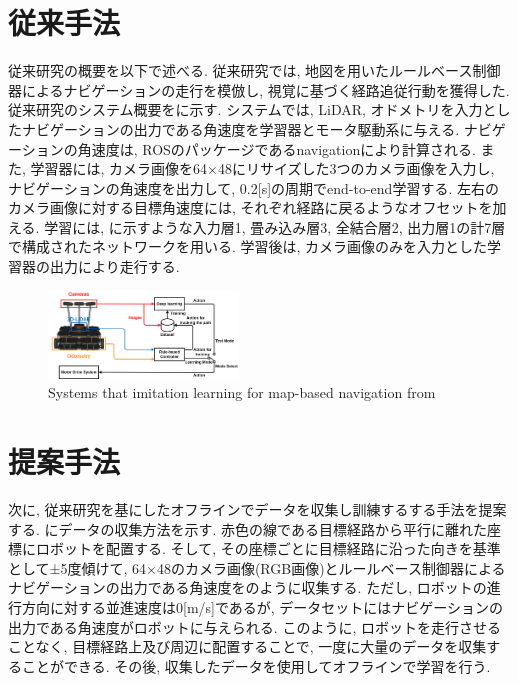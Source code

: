 \documentclass[10pt]{ujarticle}
\begin{document}
    \section{従来手法}%
    従来研究の概要を以下で述べる. 従来研究では, 地図を用いたルールベース制御器によるナビゲーションの走行を模倣し, 視覚に基づく経路追従行動を獲得した. 従来研究のシステム概要をに示す. システムでは, LiDAR, オドメトリを入力としたナビゲーションの出力である角速度を学習器とモータ駆動系に与える. ナビゲーションの角速度は, ROSのパッケージであるnavigation\cite{navigation}により計算される. また, 学習器には, カメラ画像を64×48にリサイズした3つのカメラ画像を入力し, ナビゲーションの角速度を出力して, 0.2[s]の周期でend-to-end学習する. 左右のカメラ画像に対する目標角速度には, それぞれ経路に戻るようなオフセットを加える. 学習には, に示すような入力層1, 畳み込み層3, 全結合層2, 出力層1の計7層で構成されたネットワークを用いる. 学習後は, カメラ画像のみを入力とした学習器の出力により走行する. 

    \begin{center}
        \begin{figure}[h]
            \centering
            \includegraphics[width=0.45\textwidth]{fig/si2020-okada.png}
            \caption{Systems that imitation learning for map-based navigation from }
            \label{Fig:si2020-okada}
        \end{figure}
    \end{center}

    \section{提案手法}%
    次に, 従来研究を基にしたオフラインでデータを収集し訓練するする手法を提案する. にデータの収集方法を示す. 赤色の線である目標経路から平行に離れた座標にロボットを配置する. そして, その座標ごとに目標経路に沿った向きを基準として±5度傾けて, 64×48のカメラ画像(RGB画像)とルールベース制御器によるナビゲーションの出力である角速度をのように収集する. ただし, ロボットの進行方向に対する並進速度は0[m/s]であるが, データセットにはナビゲーションの出力である角速度がロボットに与えられる. このように, ロボットを走行させることなく, 目標経路上及び周辺に配置することで, 一度に大量のデータを収集することができる. その後, 収集したデータを使用してオフラインで学習を行う. 
\end{document}

